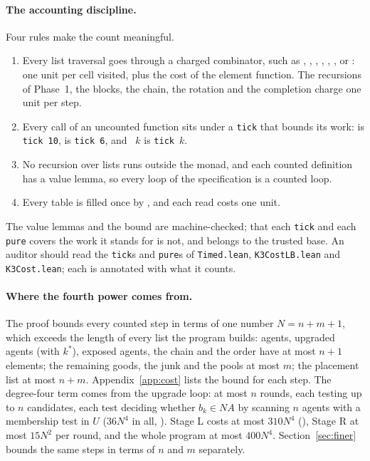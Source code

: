 \documentclass[runningheads,11pt]{llncs}
\newcommand{\NA}{\mathit{NA}}
\begin{document}
\paragraph{The accounting discipline.} Four rules make the count meaningful.
\begin{enumerate}
\item Every list traversal goes through a charged combinator, such as , , , , , ,  or : one unit per cell visited, plus the cost of the element function. The recursions of Phase~1, the blocks, the chain, the rotation and the completion charge one unit per step.
\item Every call of an uncounted function sits under a \texttt{tick} that bounds its work:  is \texttt{tick 10},  is \texttt{tick 6}, and ~$k$ is \texttt{tick}~$k$.
\item No recursion over lists runs outside the monad, and each counted definition has a value lemma, so every loop of the specification is a counted loop.
\item Every table is filled once by , and each read costs one unit.
\end{enumerate} The value lemmas and the bound are machine-checked; that each \texttt{tick} and each \texttt{pure} covers the work it stands for is not, and belongs to the trusted base. An auditor should read the \texttt{tick}s and \texttt{pure}s of \texttt{Timed.lean}, \texttt{K3CostLB.lean} and \texttt{K3Cost.lean}; each is annotated with what it counts.

\paragraph{Where the fourth power comes from.} The proof bounds every counted step in terms of one number $N=n+m+1$, which exceeds the length of every list the program builds: agents, upgraded agents (with $k^*$), exposed agents, the chain and the order have at most $n+1$ elements; the remaining goods, the junk and the pools at most $m$; the placement list at most $n+m$. Appendix~\ref{app:cost} lists the bound for each step. The degree-four term comes from the upgrade loop: at most $n$ rounds, each testing up to $n$ candidates, each test deciding whether $b_k\in\NA$ by scanning $n$ agents with a membership test in $U$ ($36N^4$ in all, ). Stage L costs at most $310N^4$ (), Stage R at most $15N^2$ per round, and the whole program at most $400N^4$. Section~\ref{sec:finer} bounds the same steps in terms of $n$ and $m$ separately.
\end{document}

